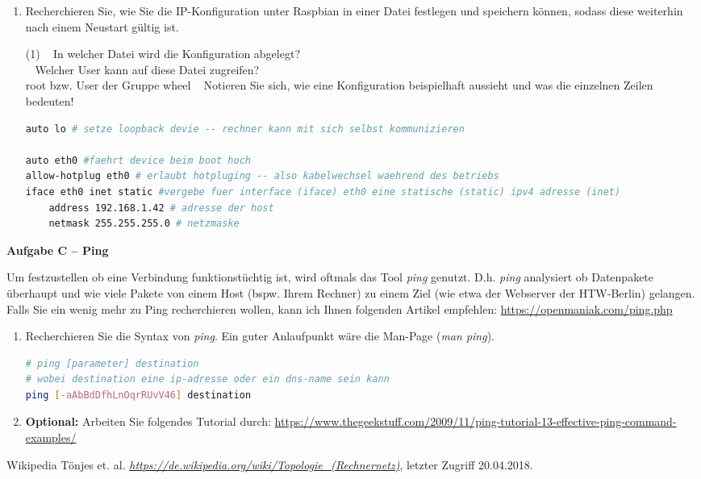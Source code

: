 \documentclass[paper=a4,fontsize=11pt]{scrartcl}%
\numberwithin{equation}{section}
\begin{document}
\begin{enumerate}
\begin{itemize}
\begin{itemize}
 	\end{itemize}
 \end{itemize}
	\item Recherchieren Sie, wie Sie die IP-Konfiguration unter Raspbian in einer Datei festlegen und speichern können, sodass diese weiterhin nach einem Neustart gültig ist.
	\begin{tasks}(1)
		\task~ In welcher Datei wird die Konfiguration abgelegt?\\
		\task~ Welcher User kann auf diese Datei zugreifen?\\
		root bzw. User der Gruppe wheel
		\task~ Notieren Sie sich, wie eine Konfiguration beispielhaft aussieht und was die einzelnen Zeilen bedeuten!
	\end{tasks}
	\begin{lstlisting}[style=Bash, language=Bash]
auto lo # setze loopback devie -- rechner kann mit sich selbst kommunizieren

auto eth0 #faehrt device beim boot hoch
allow-hotplug eth0 # erlaubt hotpluging -- also kabelwechsel waehrend des betriebs
iface eth0 inet static #vergebe fuer interface (iface) eth0 eine statische (static) ipv4 adresse (inet)
    address 192.168.1.42 # adresse der host
    netmask 255.255.255.0 # netzmaske
\end{lstlisting}
\end{enumerate}

\begin{center}\Large{\textbf{Aufgabe C -- Ping}}\end{center}\vskip0.25in
Um festzustellen ob eine Verbindung funktionstüchtig ist, wird oftmals das Tool \emph{ping} genutzt. D.h. \emph{ping} analysiert ob Datenpakete überhaupt und wie viele Pakete von einem Host (bspw. Ihrem Rechner) zu einem Ziel (wie etwa der Webserver der HTW-Berlin) gelangen. Falls Sie ein wenig mehr zu Ping recherchieren wollen, kann ich Ihnen folgenden Artikel empfehlen: \url{https://openmaniak.com/ping.php}
\begin{enumerate}
	\item Recherchieren Sie die Syntax von \emph{ping}. Ein guter Anlaufpunkt wäre die Man-Page (\emph{man ping}).
	\begin{lstlisting}[style=Bash, language=Bash]
# ping [parameter] destination 
# wobei destination eine ip-adresse oder ein dns-name sein kann
ping [-aAbBdDfhLnOqrRUvV46] destination
		\end{lstlisting}
	\item \textbf{Optional:} Arbeiten Sie folgendes Tutorial durch: \url{https://www.thegeekstuff.com/2009/11/ping-tutorial-13-effective-ping-command-examples/} 
\end{enumerate}


\begin{thebibliography}{999}
Wikipedia Tönjes et. al. \textsl{\url{https://de.wikipedia.org/wiki/Topologie_(Rechnernetz)}}, letzter Zugriff 20.04.2018.
\end{thebibliography}
\end{document}

